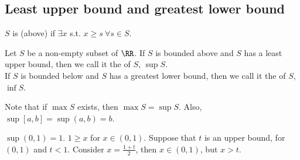 \documentclass[11pt]{scrartcl}
\numberwithin{equation}{section}
\begin{document}
\subsection{Least upper bound and greatest lower bound}
\begin{definition}
    $S$ is  (above) if $\exists x$ s.t. $x\geq s \ \forall s \in S$.
\end{definition}
\begin{definition}
    Let $S$ be a non-empty subset of $\RR$.
    If $S$ is bounded above and $S$ has a least upper bound, then 
    we call it the  of $S$, $\sup{S}$. \\
    If $S$ is bounded below and $S$ has a greatest lower bound, then 
    we call it the  of $S$, $\inf{S}$.
\end{definition}
Note that if $\max S$ exists, then $\max S = \sup S$. Also, $\sup[a,b] = \sup(a,b) = b$.
\begin{example}
    $\sup(0,1) = 1$. 
    $1 \geq x$ for $x \in (0,1)$. Suppose that $t$ is an upper bound, for 
    $(0,1)$ and $t<1$. Consider $x = \frac{1+t}{2}$, then $x \in (0,1)$,
    but $x>t$.
\end{example}
\end{document}
